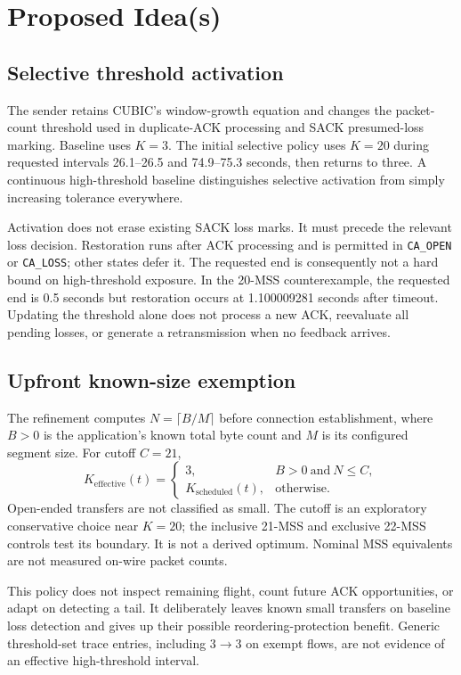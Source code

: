 \documentclass[conference]{IEEEtran}
\begin{document}
\section{Proposed Idea(s)}
\subsection{Selective threshold activation}
The sender retains CUBIC's window-growth equation and changes the
packet-count threshold used in duplicate-ACK processing and SACK
presumed-loss marking. Baseline uses $K=3$. The initial selective policy
uses $K=20$ during requested intervals 26.1--26.5 and 74.9--75.3 seconds,
then returns to three. A continuous high-threshold baseline distinguishes
selective activation from simply increasing tolerance everywhere.

Activation does not erase existing SACK loss marks. It must precede the
relevant loss decision. Restoration runs after ACK processing and is
permitted in \texttt{CA\_OPEN} or \texttt{CA\_LOSS}; other states defer it.
The requested end is consequently not a hard bound on high-threshold
exposure. In the 20-MSS counterexample, the requested end is 0.5 seconds
but restoration occurs at 1.100009281 seconds after timeout. Updating
the threshold alone does not process a new ACK, reevaluate all pending
losses, or generate a retransmission when no feedback arrives.

\subsection{Upfront known-size exemption}
The refinement computes $N=\lceil B/M\rceil$ before connection
establishment, where $B>0$ is the application's known total byte count
and $M$ is its configured segment size. For cutoff $C=21$,
\begin{equation}
K_{\mathrm{effective}}(t)=
\begin{cases}
3, & B>0\ \text{and}\ N\le C,\\
K_{\mathrm{scheduled}}(t), & \text{otherwise}.
\end{cases}
\end{equation}
Open-ended transfers are not classified as small. The cutoff is an
exploratory conservative choice near $K=20$; the inclusive 21-MSS and
exclusive 22-MSS controls test its boundary. It is not a derived optimum.
Nominal MSS equivalents are not measured on-wire packet counts.

This policy does not inspect remaining flight, count future ACK
opportunities, or adapt on detecting a tail. It deliberately leaves
known small transfers on baseline loss detection and gives up their
possible reordering-protection benefit. Generic threshold-set trace
entries, including $3\rightarrow3$ on exempt flows, are not evidence of
an effective high-threshold interval.
\end{document}
